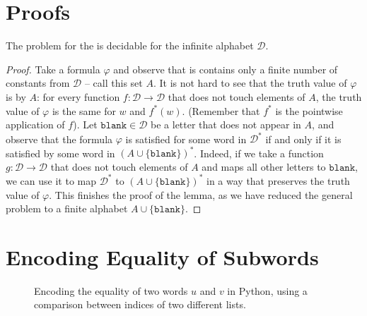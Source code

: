 \section{Proofs}

\begin{lemma}
    \label{lem:fo-emptiness}
    The  problem for the  is decidable for the infinite alphabet $\mathcal{D}$.
\end{lemma}
\begin{proof}
    Take a formula $\varphi$ and observe that is contains only a finite number of constants from $\mathcal{D}$ -- call this set $A$.
    It is not hard to see that the truth value of $\varphi$ is  by $A$: for every function $f : \mathcal{D} \to \mathcal{D}$
    that does not touch 
    elements of $A$, the truth value of $\varphi$ is the same for $w$ and $f^*(w)$. (Remember that 
    $f^*$ is the pointwise application of $f$). 
    Let $\mathtt{blank} \in \mathcal{D}$ be a letter that does not appear in $A$,
    and observe that the formula $\varphi$ is satisfied for some word in $\mathcal{D}^*$ if and only if it is satisfied by
    some word in $(A \cup \{\mathtt{blank}\})^*$. Indeed, if we take a function $g: \mathcal{D} \to \mathcal{D}$ that does not touch elements of $A$
    and maps all other letters to $\mathtt{blank}$, we can use it to map $\mathcal{D}^*$ to $(A \cup \{\mathtt{blank}\})^*$ in a way 
    that preserves the truth value of $\varphi$.
    This finishes the proof of the lemma, as we have reduced the general problem to a finite alphabet $A \cup \{\mathtt{blank}\}$.
\end{proof}

\section{Encoding Equality of Subwords}

\begin{figure}
    \centering
\begin{Shaded}
\begin{Highlighting}[]
     
         
            \OperatorTok{==}\OperatorTok{!=}
                 
     
\end{Highlighting}
\end{Shaded}
\caption{Encoding the equality of two words $u$ and $v$ in Python,
using a comparison between indices of two different lists.}
\label{fig:eq-def-different-indices}
\end{figure}

